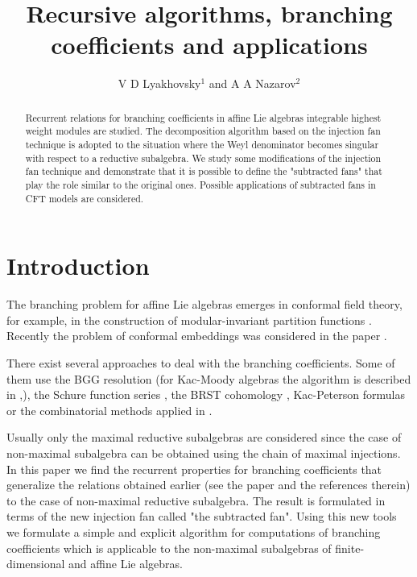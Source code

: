 \documentclass[12pt]{iopart}
\theoremstyle{definition}
\theoremstyle{definition}
\theoremstyle{definition}
\begin{document}
\title{Recursive algorithms, branching coefficients and applications}
\author{V D Lyakhovsky$^1$ and A A Nazarov$^2$}
\address{$^{1,2}$ Theoretical Department, SPb State University,
198904, Sankt-Petersburg, Russia }

\begin{abstract}
  Recurrent relations for branching coefficients in affine Lie algebras integrable highest weight modules are studied. The decomposition algorithm based on the injection fan technique is adopted to the situation where the Weyl denominator becomes singular with respect to a reductive subalgebra. We study some modifications of the injection fan technique and demonstrate that it is possible to define the "subtracted fans" that play the role similar to the original ones. Possible applications of subtracted fans in CFT models are considered.
\end{abstract}
\submitto{\JPA}

\section{Introduction}
\label{sec:introduction}

The branching problem for affine Lie algebras emerges in conformal field theory, for example,
in the construction of modular-invariant partition functions \cite{difrancesco1997cft}.
Recently the problem of conformal embeddings was considered in the paper \cite{coquereaux2008conformal}.

There exist several approaches to deal with the branching coefficients. Some of them use the BGG
resolution \cite{bernstein1975differential} (for Kac-Moody algebras the algorithm is described in
\cite{kac1990idl},\cite{wakimoto2001idl}), the Schure function series \cite{fauser2006new}, the BRST
cohomology \cite{Hwang:1994yr}, Kac-Peterson formulas \cite{kac1990idl,quella2002branching} or the
combinatorial methods applied in \cite{feigin707principal}.

Usually only the maximal reductive subalgebras are considered since the case of non-maximal subalgebra
can be obtained using the chain of maximal injections. In this paper we find the recurrent properties
for branching coefficients that generalize the relations obtained earlier (see the paper \cite{ilyin812pbc}
and the references therein) to the case of non-maximal reductive subalgebra. The result is formulated in
terms of the new injection fan called "the subtracted fan". Using this new tools we formulate a simple and
explicit algorithm for computations of branching coefficients which is applicable to the non-maximal
subalgebras of finite-dimensional and affine Lie algebras.
\end{document}
